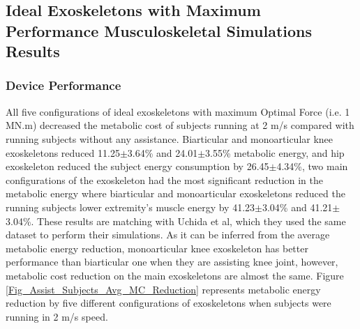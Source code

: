 \documentclass[10pt,letterpaper]{article}
\begin{document}
\subsection*{Ideal Exoskeletons with Maximum Performance Musculoskeletal Simulations Results}
\subsubsection*{Device Performance}
All five configurations of ideal exoskeletons with maximum Optimal Force (i.e. 1 MN.m) decreased the metabolic cost of subjects running at 2 m/s compared with running subjects without any assistance. Biarticular and monoarticular knee exoskeletons reduced 11.25$\pm$3.64\% and 24.01$\pm$3.55\% metabolic energy, and hip exoskeleton reduced the subject energy consumption by 26.45$\pm$4.34\%, two main configurations of the exoskeleton had the most significant reduction in the metabolic energy where biarticular and monoarticular exoskeletons reduced the running subjects lower extremity's muscle energy by 41.23$\pm$3.04\% and 41.21$\pm$3.04\%. These results are matching with Uchida et al\cite{2}, which they used the same dataset to perform their simulations. As it can be inferred from the average metabolic energy reduction, monoarticular knee exoskeleton has better performance than biarticular one when they are assisting knee joint, however, metabolic cost reduction on the main exoskeletons are almost the same. Figure \ref{Fig_Assist_Subjects_Avg_MC_Reduction} represents metabolic energy reduction by five different configurations of exoskeletons when subjects were running in 2 m/s speed.\\
\end{document}
